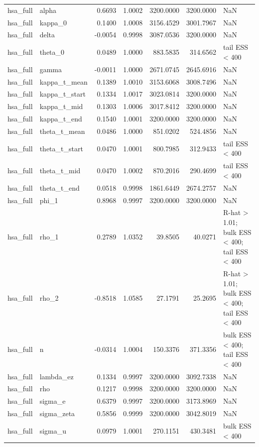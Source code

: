 \begin{tabular}{llrrrrl}
hsa\_full & alpha & 0.6693 & 1.0002 & 3200.0000 & 3200.0000 & NaN \\
hsa\_full & kappa\_0 & 0.1400 & 1.0008 & 3156.4529 & 3001.7967 & NaN \\
hsa\_full & delta & -0.0054 & 0.9998 & 3087.0536 & 3200.0000 & NaN \\
hsa\_full & theta\_0 & 0.0489 & 1.0000 & 883.5835 & 314.6562 & tail ESS < 400 \\
hsa\_full & gamma & -0.0011 & 1.0000 & 2671.0745 & 2645.6916 & NaN \\
hsa\_full & kappa\_t\_mean & 0.1389 & 1.0010 & 3153.6068 & 3008.7496 & NaN \\
hsa\_full & kappa\_t\_start & 0.1334 & 1.0017 & 3023.0814 & 3200.0000 & NaN \\
hsa\_full & kappa\_t\_mid & 0.1303 & 1.0006 & 3017.8412 & 3200.0000 & NaN \\
hsa\_full & kappa\_t\_end & 0.1540 & 1.0001 & 3200.0000 & 3200.0000 & NaN \\
hsa\_full & theta\_t\_mean & 0.0486 & 1.0000 & 851.0202 & 524.4856 & NaN \\
hsa\_full & theta\_t\_start & 0.0470 & 1.0001 & 800.7985 & 312.9433 & tail ESS < 400 \\
hsa\_full & theta\_t\_mid & 0.0470 & 1.0002 & 870.2016 & 290.4699 & tail ESS < 400 \\
hsa\_full & theta\_t\_end & 0.0518 & 0.9998 & 1861.6449 & 2674.2757 & NaN \\
hsa\_full & phi\_1 & 0.8968 & 0.9997 & 3200.0000 & 3200.0000 & NaN \\
hsa\_full & rho\_1 & 0.2789 & 1.0352 & 39.8505 & 40.0271 & R-hat > 1.01; bulk ESS < 400; tail ESS < 400 \\
hsa\_full & rho\_2 & -0.8518 & 1.0585 & 27.1791 & 25.2695 & R-hat > 1.01; bulk ESS < 400; tail ESS < 400 \\
hsa\_full & n & -0.0314 & 1.0004 & 150.3376 & 371.3356 & bulk ESS < 400; tail ESS < 400 \\
hsa\_full & lambda\_ez & 0.1334 & 0.9997 & 3200.0000 & 3092.7338 & NaN \\
hsa\_full & rho & 0.1217 & 0.9998 & 3200.0000 & 3200.0000 & NaN \\
hsa\_full & sigma\_e & 0.6379 & 0.9997 & 3200.0000 & 3173.8969 & NaN \\
hsa\_full & sigma\_zeta & 0.5856 & 0.9999 & 3200.0000 & 3042.8019 & NaN \\
hsa\_full & sigma\_u & 0.0979 & 1.0001 & 270.1151 & 430.3481 & bulk ESS < 400 \\

\end{tabular}
